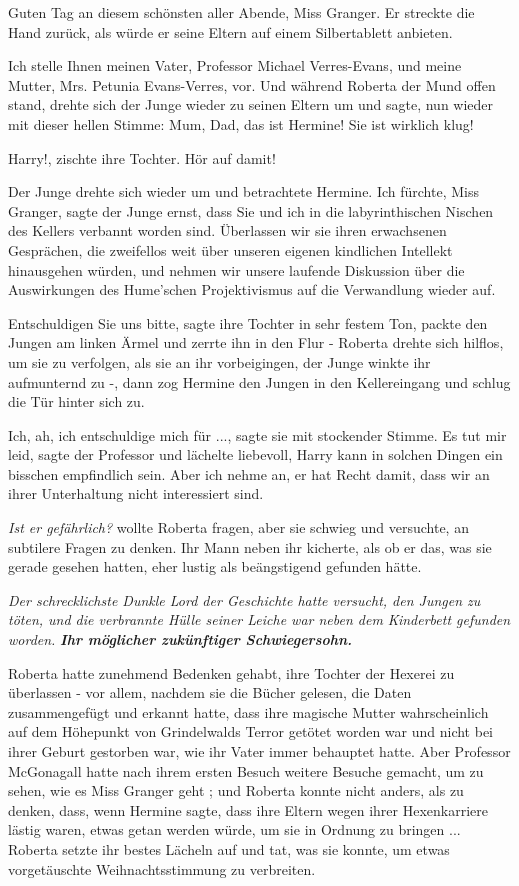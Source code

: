 \glqq{}Guten Tag an diesem schönsten aller Abende, Miss Granger.\grqq{} Er streckte die
Hand zurück, als würde er seine Eltern auf einem Silbertablett anbieten.

\glqq{}Ich stelle Ihnen meinen Vater, Professor Michael Verres-Evans, und meine
Mutter, Mrs. Petunia Evans-Verres, vor.\grqq{} Und während Roberta der Mund offen
stand, drehte sich der Junge wieder zu seinen Eltern um und sagte, nun wieder
mit dieser hellen Stimme: \glqq{}Mum, Dad, das ist Hermine! Sie ist wirklich
klug!\grqq{}

\glqq{}Harry!\grqq{}, zischte ihre Tochter. \glqq{}Hör auf damit!\grqq{}

Der Junge drehte sich wieder um und betrachtete Hermine. \glqq{}Ich fürchte, Miss
Granger\grqq{}, sagte der Junge ernst, \glqq{}dass Sie und ich in die
labyrinthischen Nischen des Kellers verbannt worden sind. Überlassen wir sie
ihren erwachsenen Gesprächen, die zweifellos weit über unseren eigenen
kindlichen Intellekt hinausgehen würden, und nehmen wir unsere laufende
Diskussion über die Auswirkungen des Hume'schen Projektivismus auf die
Verwandlung wieder auf.\grqq{}

\glqq{}Entschuldigen Sie uns bitte\grqq{}, sagte ihre Tochter in sehr festem Ton,
packte den Jungen am linken Ärmel und zerrte ihn in den Flur - Roberta drehte
sich hilflos, um sie zu verfolgen, als sie an ihr vorbeigingen, der Junge winkte
ihr aufmunternd zu -, dann zog Hermine den Jungen in den Kellereingang und
schlug die Tür hinter sich zu.

\glqq{}Ich, ah, ich entschuldige mich für ...\grqq{}, sagte sie mit stockender
Stimme. \glqq{}Es tut mir leid\grqq{}, sagte der Professor und lächelte
liebevoll, \glqq{}Harry kann in solchen Dingen ein bisschen empfindlich sein.
Aber ich nehme an, er hat Recht damit, dass wir an ihrer Unterhaltung nicht
interessiert sind.\grqq{}

\emph{Ist er gefährlich?} wollte Roberta fragen, aber sie schwieg und
versuchte, an subtilere Fragen zu denken. Ihr Mann neben ihr kicherte, als ob er
das, was sie gerade gesehen hatten, eher lustig als beängstigend gefunden hätte.

\emph{Der schrecklichste Dunkle Lord der Geschichte hatte versucht, den Jungen
zu töten, und die verbrannte Hülle seiner Leiche war neben dem Kinderbett
gefunden worden.}
\textbf{\emph{ Ihr möglicher zukünftiger Schwiegersohn.} }

Roberta hatte zunehmend Bedenken gehabt, ihre Tochter der Hexerei zu überlassen
- vor allem, nachdem sie die Bücher gelesen, die Daten zusammengefügt und
erkannt hatte, dass ihre magische Mutter wahrscheinlich auf dem Höhepunkt von
Grindelwalds Terror getötet worden war und nicht bei ihrer Geburt gestorben war,
wie ihr Vater immer behauptet hatte. Aber Professor McGonagall hatte nach ihrem
ersten Besuch weitere Besuche gemacht, um \glqq{}zu sehen, wie es Miss Granger
geht\grqq{} ; und Roberta konnte nicht anders, als zu denken, dass, wenn Hermine
sagte, dass ihre Eltern wegen ihrer Hexenkarriere lästig waren, etwas getan
werden würde, um sie in Ordnung zu bringen ... Roberta setzte ihr bestes Lächeln
auf und tat, was sie konnte, um etwas vorgetäuschte Weihnachtsstimmung zu
verbreiten.

